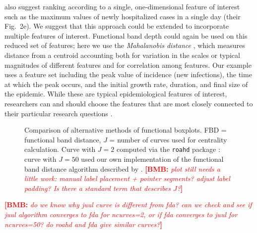 \documentclass[12pt]{article}
\newcommand{\comment}{\showcomment}
\newcommand{\showcomment}[3]{\textcolor{#1}{\textbf{[#2: }\textsl{#3}\textbf{]}}}
\newcommand{\bmb}[1]{\comment{red}{BMB}{#1}}
\theoremstyle{definition} %
\begin{document}
\cite{juul2021fixed} also suggest ranking according to a single, one-dimensional feature of interest such as the maximum values of newly hospitalized cases in a single day (their Fig.~2e). We suggest that this approach could be extended to incorporate multiple features of interest. Functional band depth could again be used on this reduced set of features; here we use the \emph{Mahalanobis distance} \citep{mahalanobis1936generalized}, which measures distance from a centroid accounting both for variation in the scales or typical magnitudes of different features and for correlation among features.
Our example uses a feature set including the peak value of incidence (new infections), the time at which the peak occurs, and the initial growth rate, duration, and final size of the epidemic. While these are typical epidemiological features of interest, researchers can and should choose the features that are most closely connected to their particular research questions \citep{probert2016decision}.

\begin{figure}[h!]
  \centering
  
  \caption{Comparison of alternative methods of functional boxplots. FBD = functional band distance, $J$ = number of curves used for centrality calculation. Curve with $J=2$ computed via the \texttt{roahd} package \citep{roahd}: curve with $J=50$ used our own implementation of the functional band distance algorithm described by \cite{juul2021fixed}.
    \bmb{plot still needs a little work: manual label placement + pointer segments? adjust label padding? Is there a standard term that describes $J$?}
  }\label{p.a}
\end{figure}

\bmb{do we know why juul curve is different from fda? can we check and see if juul algorithm converges to fda for ncurves=2, or if fda converges to juul for ncurves=50? do roahd and fda give similar curves?}
  

\end{document}
